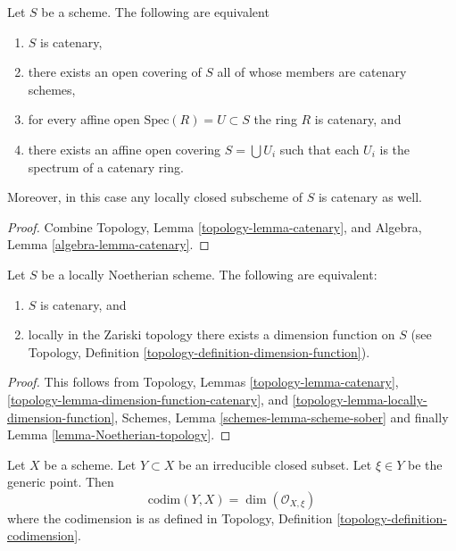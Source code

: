 \begin{lemma}
\label{lemma-catenary-local}
Let $S$ be a scheme. The following are equivalent
\begin{enumerate}
\item $S$ is catenary,
\item there exists an open covering of $S$ all of whose members are
catenary schemes,
\item for every affine open $\text{Spec}(R) = U \subset S$ the ring
$R$ is catenary, and
\item there exists an affine open covering $S = \bigcup U_i$ such
that each $U_i$ is the spectrum of a catenary ring.
\end{enumerate}
Moreover, in this case any locally closed subscheme of $S$ is catenary
as well.
\end{lemma}

\begin{proof}
Combine Topology, Lemma \ref{topology-lemma-catenary}, and
Algebra, Lemma \ref{algebra-lemma-catenary}.
\end{proof}

\begin{lemma}
\label{lemma-catenary-dimension-function}
Let $S$ be a locally Noetherian scheme.
The following are equivalent:
\begin{enumerate}
\item $S$ is catenary, and
\item locally in the Zariski topology there exists a dimension function
on $S$ (see Topology, Definition \ref{topology-definition-dimension-function}).
\end{enumerate}
\end{lemma}

\begin{proof}
This follows from
Topology, Lemmas
\ref{topology-lemma-catenary},
\ref{topology-lemma-dimension-function-catenary}, and
\ref{topology-lemma-locally-dimension-function},
Schemes, Lemma \ref{schemes-lemma-scheme-sober}
and finally Lemma \ref{lemma-Noetherian-topology}.
\end{proof}

\begin{lemma}
\label{lemma-codimension-local-ring}
Let $X$ be a scheme. Let $Y \subset X$ be an irreducible closed
subset. Let $\xi \in Y$ be the generic point. Then
$$
\text{codim}(Y, X) = \dim(\mathcal{O}_{X, \xi})
$$
where the codimension is as defined in
Topology, Definition \ref{topology-definition-codimension}.
\end{lemma}


